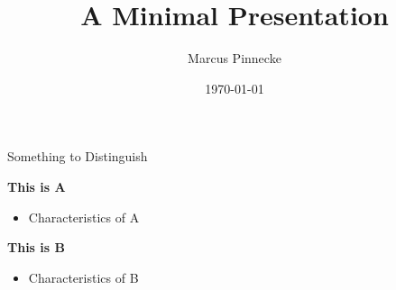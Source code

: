 \documentclass{beamer}
\title{A Minimal Presentation}
\date{\today}
\author{Marcus Pinnecke}
\institute{Metrocity Theme Headquarter}
\begin{document}
  \begin{frame}[t]{Something to Distinguish}   
   \begin{spacing}{1.2}
    {\textbf{This is A}}
    \begin{itemize}
    \item Characteristics of A
    \end{itemize}
    \vspace{1em}
    {\textbf{This is B}}
    \begin{itemize}
    \item Characteristics of B
    \end{itemize}
    \end{spacing}
  \end{frame}
\end{document}
